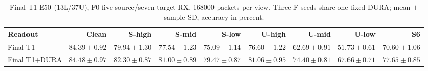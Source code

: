 \begin{table}[t]\centering\footnotesize
\caption{Final T1-E50 (13L/37U), F0 five-source/seven-target RX, 168000 packets per view. Three F seeds share one fixed DURA; mean $\pm$ sample SD, accuracy in percent.}
\label{tab:final-t1-f0}
\begin{tabular}{lrrrrrrrr}\toprule
Readout & Clean & S-high & S-mid & S-low & U-high & U-mid & U-low & S6\\\midrule
Final T1 & $84.39\!\pm\!0.92$ & $79.94\!\pm\!1.30$ & $77.54\!\pm\!1.23$ & $75.09\!\pm\!1.14$ & $76.60\!\pm\!1.22$ & $62.69\!\pm\!0.91$ & $51.73\!\pm\!0.61$ & $70.60\!\pm\!1.06$ \\
Final T1+DURA & $84.48\!\pm\!0.97$ & $82.30\!\pm\!0.87$ & $81.00\!\pm\!0.89$ & $79.47\!\pm\!0.87$ & $81.06\!\pm\!0.95$ & $74.40\!\pm\!0.81$ & $67.66\!\pm\!0.71$ & $77.65\!\pm\!0.85$ \\
\bottomrule\end{tabular}\end{table}
